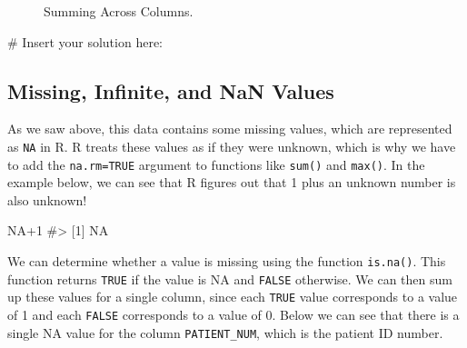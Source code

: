 \documentclass[
  letterpaper,
]{krantz}
\makeatletter
\newenvironment{Shaded}{\begin{snugshade}}{\end{snugshade}}
\newcommand{\CommentTok}[1]{\textcolor[rgb]{0.37,0.37,0.37}{#1}}
\newcommand{\ConstantTok}[1]{\textcolor[rgb]{0.56,0.35,0.01}{#1}}
\newcommand{\DecValTok}[1]{\textcolor[rgb]{0.68,0.00,0.00}{#1}}
\newcommand{\FunctionTok}[1]{\textcolor[rgb]{0.28,0.35,0.67}{#1}}
\newcommand{\NormalTok}[1]{\textcolor[rgb]{0.00,0.23,0.31}{#1}}
\newcommand{\SpecialCharTok}[1]{\textcolor[rgb]{0.37,0.37,0.37}{#1}}
\newenvironment{kframe}{%
\medskip{}
\setlength{\fboxsep}{.8em}
 \def\at@end@of@kframe{}%
 \ifinner\ifhmode%
  \def\at@end@of@kframe{\end{minipage}}%
  \begin{minipage}{\columnwidth}%
 \fi\fi%
 \def\FrameCommand##1{\hskip\@totalleftmargin \hskip-\fboxsep
 \colorbox{shadecolor}{##1}\hskip-\fboxsep
     \hskip-\linewidth \hskip-\@totalleftmargin \hskip\columnwidth}%
 \MakeFramed {\advance\hsize-\width
   \@totalleftmargin\z@ \linewidth\hsize
   \@setminipage}}%
 {\par\unskip\endMakeFramed%
 \at@end@of@kframe}
\renewenvironment{Shaded}{\begin{kframe}}{\end{kframe}}
\makeatother
\begin{document}
\begin{figure}


\caption{\label{fig-promis-col-sums}Summing Across Columns.}

\end{figure}%

\begin{Shaded}
\begin{Highlighting}[]
\CommentTok{\# Insert your solution here:}
\end{Highlighting}
\end{Shaded}

\subsection{Missing, Infinite, and NaN
Values}\label{missing-infinite-and-nan-values}

As we saw above, this data contains some missing values, which are
represented as \texttt{NA} in R. R treats these values as if they were
unknown, which is why we have to add the \texttt{na.rm=TRUE} argument to
functions like \texttt{sum()} and \texttt{max()}. In the example below,
we can see that R figures out that 1 plus an unknown number is also
unknown!

\begin{Shaded}
\begin{Highlighting}[]
\ConstantTok{NA}\SpecialCharTok{+}\DecValTok{1}
\CommentTok{\#\textgreater{} [1] NA}
\end{Highlighting}
\end{Shaded}

We can determine whether a value is missing using the function
\texttt{is.na()}. This function returns \texttt{TRUE} if the value is NA
and \texttt{FALSE} otherwise. We can then sum up these values for a
single column, since each \texttt{TRUE} value corresponds to a value of
1 and each \texttt{FALSE} corresponds to a value of 0. Below we can see
that there is a single NA value for the column \texttt{PATIENT\_NUM},
which is the patient ID number.

\begin{Shaded}
\end{Shaded}
\end{document}
